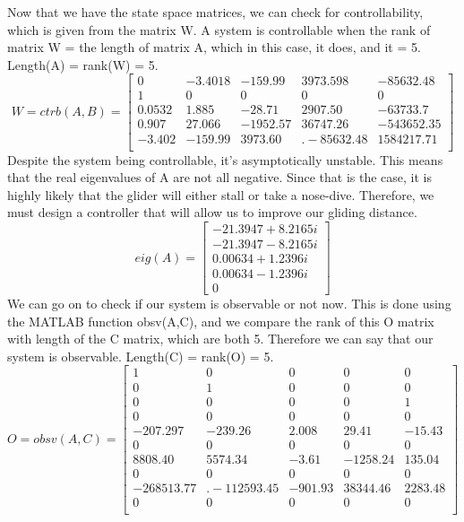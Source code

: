 \documentclass[12pt]{article}
\begin{document}
Now that we have the state space matrices, we can check for controllability, which is given from the matrix W. A system is controllable when the rank of matrix W = the length of matrix A, which in this case, it does, and it = 5. Length(A) = rank(W) = 5.
\label{eqctrb}
\begin{equation}
    W = ctrb(A,B) = \begin{bmatrix}
    0 & -3.4018 & -159.99 & 3973.598 & -85632.48 \\ 1 & 0 & 0 & 0 & 0\\0.0532 &	1.885 & -28.71 & 2907.50 & -63733.7\\ 0.907 & 27.066 & -1952.57 & 36747.26 & -543652.35\\-3.402 & -159.99 & 3973.60 &. -85632.48 & 1584217.71\\
    \end{bmatrix}
\end{equation}
Despite the system being controllable, it's asymptotically unstable. This means that the real eigenvalues of A are not all negative. Since that is the case, it is highly likely that the glider will either stall or take a nose-dive. Therefore, we must design a controller that will allow us to improve our gliding distance.
\begin{equation*}
    eig(A) = \begin{bmatrix}
    -21.3947 + 8.2165i
\\-21.3947 - 8.2165i
\\0.00634 + 1.2396i\\0.00634 - 1.2396i\\0
    \end{bmatrix}
\end{equation*}
We can go on to check if our system is observable or not now. This is done using the MATLAB function obsv(A,C), and we compare the rank of this O matrix with length of the C matrix, which are both 5. Therefore we can say that our system is observable. Length(C) = rank(O) = 5.
\label{eqobs}
\begin{equation}
    O = obsv(A,C) = \begin{bmatrix}
    1&0&0&0&0\\0&1&0&0&0\\0&0&0&0&1\\0&0&0&0&0\\-207.297& -239.26 & 2.008 & 29.41&	-15.43\\ 0&0&0&0&0\\ 8808.40 & 5574.34 & -3.61 & -1258.24 & 135.04\\ 0&0&0&0&0\\-268513.77 &. -112593.45 & -901.93 & 38344.46 & 2283.48\\0&0&0&0&0\\
    \end{bmatrix}
\end{equation}
\end{document}
